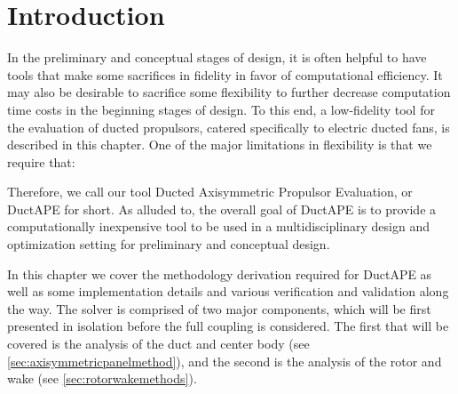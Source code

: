 \section{Introduction}
\label{sec:ductintro}

In the preliminary and conceptual stages of design, it is often helpful to have tools that make some sacrifices in fidelity in favor of computational efficiency.
%
It may also be desirable to sacrifice some flexibility to further decrease computation time costs in the beginning stages of design.
%
To this end, a low-fidelity tool for the evaluation of ducted propulsors, catered specifically to electric ducted fans, is described in this chapter.
%
One of the major limitations in flexibility is that we require that:

\begin{assumption}
    \label{asm:axisymmetric}




\end{assumption}

\noindent Therefore, we call our tool Ducted Axisymmetric Propulsor Evaluation, or DuctAPE for short.
%
As alluded to, the overall goal of DuctAPE is to provide a computationally inexpensive tool to be used in a multidisciplinary design and optimization setting for preliminary and conceptual design.

In this chapter we cover the methodology derivation required for DuctAPE as well as some implementation details and various verification and validation along the way.
%
The solver is comprised of two major components, which will be first presented in isolation before the full coupling is considered.
%
The first that will be covered is the analysis of the duct and center body (see \cref{sec:axisymmetricpanelmethod}), and the second is the analysis of the rotor and wake (see \cref{sec:rotorwakemethods}).

